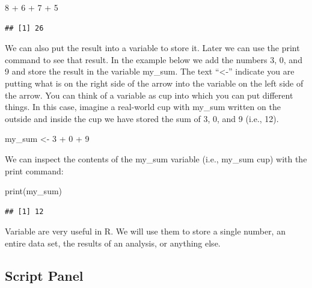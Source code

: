 \documentclass[
]{krantz}
\makeatletter
\newenvironment{Shaded}{\begin{snugshade}}{\end{snugshade}}
\newcommand{\DecValTok}[1]{\textcolor[rgb]{0.06,0.06,0.06}{#1}}
\newcommand{\FunctionTok}[1]{\textcolor[rgb]{0,0,0}{#1}}
\newcommand{\NormalTok}[1]{#1}
\newcommand{\OtherTok}[1]{\textcolor[rgb]{0.37,0.37,0.37}{#1}}
\newcommand{\SpecialCharTok}[1]{\textcolor[rgb]{0,0,0}{#1}}
\newenvironment{kframe}{%
\medskip{}
\setlength{\fboxsep}{.8em}
 \def\at@end@of@kframe{}%
 \ifinner\ifhmode%
  \def\at@end@of@kframe{\end{minipage}}%
  \begin{minipage}{\columnwidth}%
 \fi\fi%
 \def\FrameCommand##1{\hskip\@totalleftmargin \hskip-\fboxsep
 \colorbox{shadecolor}{##1}\hskip-\fboxsep
     \hskip-\linewidth \hskip-\@totalleftmargin \hskip\columnwidth}%
 \MakeFramed {\advance\hsize-\width
   \@totalleftmargin\z@ \linewidth\hsize
   \@setminipage}}%
 {\par\unskip\endMakeFramed%
 \at@end@of@kframe}
\renewenvironment{Shaded}{\begin{kframe}}{\end{kframe}}
\makeatother
\begin{document}
\begin{Shaded}
\begin{Highlighting}[]
\DecValTok{8} \SpecialCharTok{+} \DecValTok{6} \SpecialCharTok{+} \DecValTok{7} \SpecialCharTok{+} \DecValTok{5}
\end{Highlighting}
\end{Shaded}

\begin{verbatim}
## [1] 26
\end{verbatim}

We can also put the result into a variable to store it. Later we can use the print command to see that result. In the example below we add the numbers 3, 0, and 9 and store the result in the variable my\_sum. The text ``\textless-'' indicate you are putting what is on the right side of the arrow into the variable on the left side of the arrow. You can think of a variable as cup into which you can put different things. In this case, imagine a real-world cup with my\_sum written on the outside and inside the cup we have stored the sum of 3, 0, and 9 (i.e., 12).

\begin{Shaded}
\begin{Highlighting}[]
\NormalTok{my\_sum }\OtherTok{\textless{}{-}} \DecValTok{3} \SpecialCharTok{+} \DecValTok{0} \SpecialCharTok{+} \DecValTok{9}
\end{Highlighting}
\end{Shaded}

We can inspect the contents of the my\_sum variable (i.e., my\_sum cup) with the print command:

\begin{Shaded}
\begin{Highlighting}[]
\FunctionTok{print}\NormalTok{(my\_sum)}
\end{Highlighting}
\end{Shaded}

\begin{verbatim}
## [1] 12
\end{verbatim}

Variable are very useful in R. We will use them to store a single number, an entire data set,
the results of an analysis, or anything else.

\hypertarget{script-panel}{%
\subsection{Script Panel}\label{script-panel}}
\end{document}
